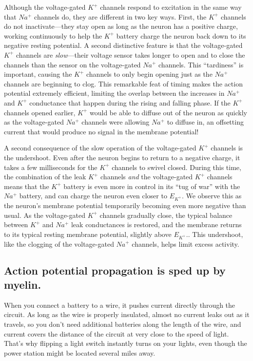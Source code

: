 \documentclass[
]{book}
\begin{document}
Although the voltage-gated \(K^+\) channels respond to excitation in the same way that \(Na^+\) channels do, they are different in two key ways. First, the \(K^+\) channels do not inactivate---they stay open as long as the neuron has a positive charge, working continuously to help the \(K^+\) battery charge the neuron back down to its negative resting potential. A second distinctive feature is that the voltage-gated \(K^+\) channels are \emph{slow}---their voltage sensor takes longer to open and to close the channels than the sensor on the voltage-gated \(Na^+\) channels. This ``tardiness'' is important, causing the \(K^+\) channels to only begin opening just as the \(Na^+\) channels are beginning to clog. This remarkable feat of timing makes the action potential extremely efficient, limiting the overlap between the increases in \(Na^+\) and \(K^+\) conductance that happen during the rising and falling phase. If the \(K^+\) channels opened earlier, \(K^+\) would be able to diffuse out of the neuron as quickly as the voltage-gated \(Na^+\) channels were allowing \(Na^+\) to diffuse in, an offsetting current that would produce no signal in the membrane potential!

A second consequence of the slow operation of the voltage-gated \(K^+\) channels is the undershoot. Even after the neuron begins to return to a negative charge, it takes a few milliseconds for the \(K^+\) channels to swivel closed. During this time, the combination of the leak \(K^+\) channels \emph{and} the voltage-gated \(K^+\) channels means that the \(K^+\) battery is even more in control in its ``tug of war'' with the \(Na^+\) battery, and can charge the neuron even closer to \(E_{K^+}\). We observe this as the neuron's membrane potential temporarily becoming even more negative than usual. As the voltage-gated \(K^+\) channels gradually close, the typical balance between \(K^+\) and \(Na^+\) leak conductances is restored, and the membrane returns to its typical resting membrane potential, slightly above \(E_{K^+}\).. This undershoot, like the clogging of the voltage-gated \(Na^+\) channels, helps limit excess activity.

\hypertarget{action-potential-propagation-is-sped-up-by-myelin.}{%
\subsection{Action potential propagation is sped up by myelin.}\label{action-potential-propagation-is-sped-up-by-myelin.}}

When you connect a battery to a wire, it pushes current directly through the circuit. As long as the wire is properly insulated, almost no current leaks out as it travels, so you don't need additional batteries along the length of the wire, and current covers the distance of the circuit at very close to the speed of light. That's why flipping a light switch instantly turns on your lights, even though the power station might be located several miles away.
\end{document}
